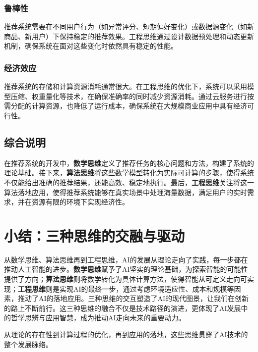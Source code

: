 \subsubsection*{鲁棒性}
推荐系统需要在不同用户行为（如异常评分、短期偏好变化）或数据源变化（如新商品、新用户）下保持稳定的推荐效果。工程思维通过设计数据预处理和动态更新机制，确保系统在面对这些变化时依然具有稳定的性能。

\subsubsection*{经济效应}
推荐系统的存储和计算资源消耗通常很大。在工程思维的优化下，系统可以采用模型压缩、权重量化等技术，在确保准确率的同时减少资源消耗。通过云服务进行按需分配的计算资源，也降低了运行成本，确保系统在大规模商业应用中具有经济可行性。


\subsection{ 综合说明}

在推荐系统的开发中，{\bf 数学思维}定义了推荐任务的核心问题和方法，构建了系统的理论基础。接下来，{\bf 算法思维}将这些数学模型转化为实际可计算的步骤，使得系统不仅能给出准确的推荐结果，还能高效、稳定地执行。最后，{\bf 工程思维}关注将这一算法落地应用，使得推荐系统能够在真实场景中处理海量数据，满足用户的实时需求，并在资源有限的环境下实现经济性。


\section{ 小结：三种思维的交融与驱动}

从数学思维、算法思维再到工程思维，AI的发展从理论走向了实践，每一步都在推动人工智能的进步。{\bf 数学思维}赋予了AI坚实的理论基础，为探索智能的可能性提供了方向；{\bf 算法思维}则将数学转化为具体计算方法，使得智能从可定义走向可实现；{\bf 工程思维}则是实现AI的最终一步，通过考虑环境适应性、成本和规模等因素，推动了AI的落地应用。三种思维的交互塑造了AI的现代图景，让我们在创新的路上不断前行。这三种思维的融合不仅是技术路径的演进，更体现了AI发展中的哲学思辨与应用智慧，成为推动AI走向未来的重要动力。

从理论的存在性到计算过程的优化，再到应用的落地，这些思维贯穿了AI技术的整个发展脉络。

\newpage